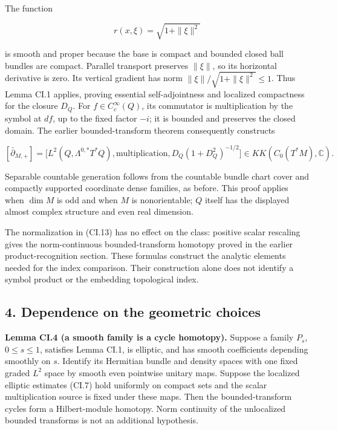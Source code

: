 \documentclass[
  11pt,
]{article}
\begin{document}
The function

\[
 r(x,\xi)=\sqrt{1+\|\xi\|^2}
 \tag{CI.15}
\]

is smooth and proper because the base is compact and bounded closed ball
bundles are compact. Parallel transport preserves \(\|\xi\|\), so its
horizontal derivative is zero. Its vertical gradient has norm
\(\|\xi\|/\sqrt{1+\|\xi\|^2}\leq1\). Thus Lemma CI.1 applies, proving
essential self-adjointness and localized compactness for the closure
\(D_Q\). For \(f\in C_c^\infty(Q)\), its commutator is multiplication by
the symbol at \(df\), up to the fixed factor \(-i\); it is bounded and
preserves the closed domain. The earlier bounded-transform theorem
consequently constructs

\[
 [\bar\partial_{M,+}]
 =\big[L^2(Q,\Lambda^{0,*}T^*Q),\text{multiplication},
            D_Q(1+D_Q^2)^{-1/2}\big]
 \in KK(C_0(T^*M),\mathbb C).
 \tag{CI.16}
\]

Separable countable generation follows from the countable bundle chart
cover and compactly supported coordinate dense families, as before. This
proof applies when \(\dim M\) is odd and when \(M\) is nonorientable;
\(Q\) itself has the displayed almost complex structure and even real
dimension.

The normalization in (CI.13) has no effect on the class: positive scalar
rescaling gives the norm-continuous bounded-transform homotopy proved in
the earlier product-recognition section. These formulas construct the
analytic elements needed for the index comparison. Their construction
alone does not identify a symbol product or the embedding topological
index.

\subsection{4. Dependence on the geometric
choices}\label{dependence-on-the-geometric-choices}

\textbf{Lemma CI.4 (a smooth family is a cycle homotopy).} Suppose a
family \(P_s\), \(0\leq s\leq1\), satisfies Lemma CI.1, is elliptic, and
has smooth coefficients depending smoothly on \(s\). Identify its
Hermitian bundle and density spaces with one fixed graded \(L^2\) space
by smooth even pointwise unitary maps. Suppose the localized elliptic
estimates (CI.7) hold uniformly on compact sets and the scalar
multiplication source is fixed under these maps. Then the
bounded-transform cycles form a Hilbert-module homotopy. Norm continuity
of the unlocalized bounded transforms is not an additional hypothesis.
\end{document}
